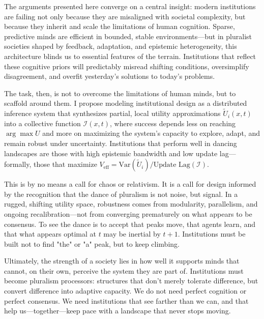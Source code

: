 \documentclass[12pt]{article}  %
\begin{document}
The arguments presented here converge on a central insight: modern institutions are failing not only because they are misaligned with societal complexity, but because they inherit and scale the limitations of human cognition. Sparse, predictive minds are efficient in bounded, stable environments—but in pluralist societies shaped by feedback, adaptation, and epistemic heterogeneity, this architecture blinds us to essential features of the terrain. Institutions that reflect these cognitive priors will predictably misread shifting conditions, oversimplify disagreement, and overfit yesterday’s solutions to today’s problems.

The task, then, is not to overcome the limitations of human minds, but to scaffold around them. I propose modeling institutional design as a distributed inference system that synthesizes partial, local utility approximations \( \tilde{U}_i(x, t) \) into a collective function \( \mathcal{I}(x, t) \), where success depends less on reaching \( \arg\max U \) and more on maximizing the system’s capacity to explore, adapt, and remain robust under uncertainty. Institutions that perform well in dancing landscapes are those with high epistemic bandwidth and low update lag—formally, those that maximize \( V_{\text{eff}} = \text{Var}(\tilde{U}_i) / \text{Update Lag}(\mathcal{I}) \).

This is by no means a call for chaos or relativism. It is a call for design informed by the recognition that the dance of pluralism is not noise, but signal. In a rugged, shifting utility space, robustness comes from modularity, parallelism, and ongoing recalibration—not from converging prematurely on what appears to be consensus. To see the dance is to accept that peaks move, that agents learn, and that what appears optimal at \( t \) may be inertial by \( t+1 \). Institutions must be built not to find "the" or "a" peak, but to keep climbing.

Ultimately, the strength of a society lies in how well it supports minds that cannot, on their own, perceive the system they are part of. Institutions must become pluralism processors: structures that don’t merely tolerate difference, but convert difference into adaptive capacity. We do not need perfect cognition or perfect consensus. We need institutions that see farther than we can, and that help us—together—keep pace with a landscape that never stops moving.

\newpage
\printbibliography
\end{document}
